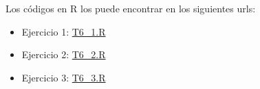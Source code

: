 \documentclass[12pt]{article}
\begin{document}

 \pagebreak
 \pagebreak
 \pagebreak
Los códigos en R los puede encontrar en los siguientes urls:
\begin{itemize}
    \item Ejercicio 1: \href{https://github.com/Hamgalex/MetodosEstadisticosMultivariados/blob/main/T6/T6_1.R}{T6\_1.R}
    \item Ejercicio 2: \href{https://github.com/Hamgalex/MetodosEstadisticosMultivariados/blob/main/T6/T6_2.R}{T6\_2.R}
    \item Ejercicio 3: \href{https://github.com/Hamgalex/MetodosEstadisticosMultivariados/blob/main/T6/T6_3.R}{T6\_3.R}
\end{itemize}


\end{document}
